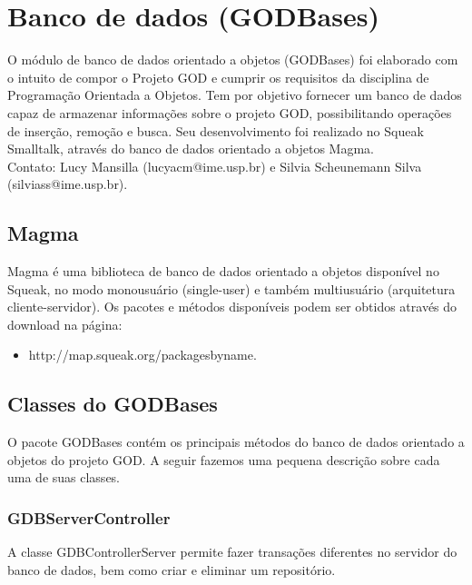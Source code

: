 \section{Banco de dados (GODBases)}

O módulo de banco de dados orientado a objetos (GODBases) foi elaborado com o intuito de compor o Projeto GOD e cumprir os requisitos da disciplina de Programação Orientada a Objetos. Tem por objetivo fornecer um banco de dados capaz de armazenar informações sobre o projeto GOD, possibilitando operações de inserção, remoção e busca. Seu desenvolvimento foi realizado no Squeak Smalltalk, através do banco de dados orientado a objetos Magma.\\
Contato: Lucy Mansilla (lucyacm@ime.usp.br) e Silvia Scheunemann Silva (silviass@ime.usp.br).


\subsection{Magma}
Magma é uma biblioteca de banco de dados orientado a objetos disponível no Squeak, no modo monousuário (single-user) e também multiusuário (arquitetura cliente-servidor). Os pacotes e métodos disponíveis podem ser obtidos através do download na página:
\begin{itemize}
\item{http://map.squeak.org/packagesbyname.}
\end{itemize}

\subsection{ Classes do GODBases}
O pacote GODBases contém os principais métodos do banco de dados orientado a objetos do projeto GOD. A seguir fazemos uma pequena descrição sobre cada uma de suas classes.


\subsubsection{GDBServerController}

A classe GDBControllerServer permite fazer transações diferentes no servidor do banco de dados, bem como criar e eliminar um repositório. 


